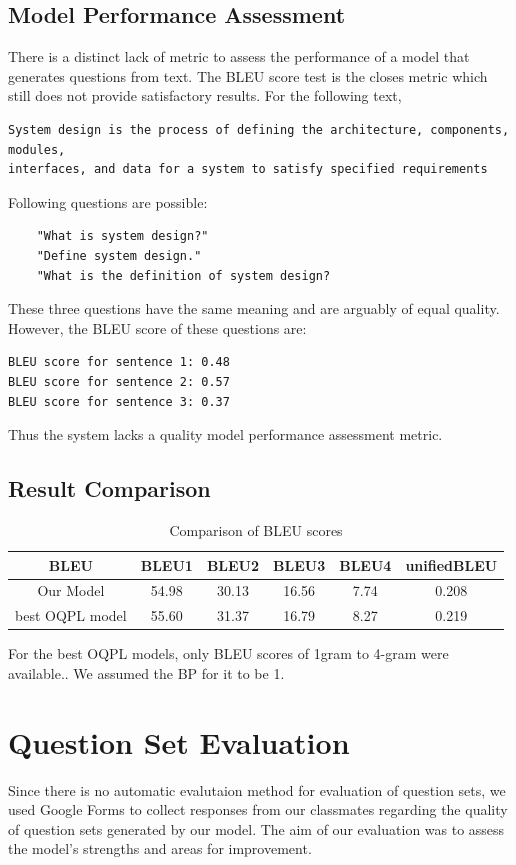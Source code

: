 \documentclass[12pt]{report}
\begin{document}
\subsection{Model Performance Assessment}
There is a distinct lack of metric to assess the performance of a model that generates questions from text. The BLEU score test is the closes metric which still does not provide satisfactory results.
For the following text,
\begin{verbatim}
System design is the process of defining the architecture, components, modules, 
interfaces, and data for a system to satisfy specified requirements
\end{verbatim}
Following questions are possible:
\begin{verbatim}
    "What is system design?"
    "Define system design."
    "What is the definition of system design?
\end{verbatim}
These three questions have the same meaning and are arguably of equal quality. However, the BLEU score of these questions are:
\begin{verbatim}
BLEU score for sentence 1: 0.48
BLEU score for sentence 2: 0.57
BLEU score for sentence 3: 0.37
\end{verbatim}

Thus the system lacks a quality model performance assessment metric.
\subsection{Result Comparison}
\begin{table}[ht!]
    \centering
    \begin{tabular}{c|c|c|c|c|c}
    \hline
{\textbf{BLEU}} &BLEU1 & BLEU2 & BLEU3& BLEU4& unifiedBLEU\\
\hline
    Our Model& 54.98 & 30.13 & 16.56 & 7.74 & 0.208\\
    best OQPL model & 55.60 & 31.37 & 16.79 & 8.27 & 0.219 \\
    \hline
    \end{tabular}
    \caption{Comparison of BLEU scores}
\end{table}
For the best OQPL models, only BLEU scores of 1gram to 4-gram were available.{\cite{lopez2021simplifying}}. We assumed the BP for it to be 1.
\pagebreak
\section{Question Set Evaluation}
 Since there is no automatic evalutaion method for evaluation of question sets, we used Google Forms to collect responses from our classmates regarding the quality of question sets generated by our model. The aim of our evaluation was to assess the model's strengths and areas for improvement.
\end{document}
